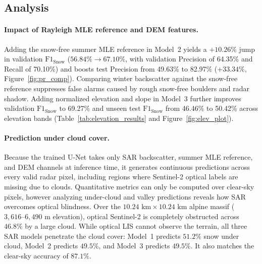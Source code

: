 \documentclass{article}
\begin{document}
\subsection{Analysis}
\paragraph{Impact of Rayleigh MLE reference and DEM features.} Adding the snow-free summer MLE reference in Model~2 yields a $+10.26\%$ jump in validation $\text{F1}_{\text{Snow}}$ ($56.84\% \rightarrow 67.10\%$, with validation Precision of 64.35\% and Recall of 70.10\%) and boosts test Precision from 49.63\% to 82.97\% ($+33.34\%$, Figure~\ref{fig:pr_comp}). Comparing winter backscatter against the snow-free reference suppresses false alarms caused by rough snow-free boulders and radar shadow. Adding normalized elevation and slope in Model~3 further improves validation $\text{F1}_{\text{Snow}}$ to 69.27\% and unseen test $\text{F1}_{\text{Snow}}$ from 46.46\% to 50.42\% across elevation bands (Table~\ref{tab:elevation_results} and Figure~\ref{fig:elev_plot}).

\paragraph{Prediction under cloud cover.} Because the trained U-Net takes only SAR backscatter, summer MLE reference, and DEM channels at inference time, it generates continuous predictions across every valid radar pixel, including regions where Sentinel-2 optical labels are missing due to clouds. Quantitative metrics can only be computed over clear-sky pixels, however analyzing under-cloud and valley predictions reveals how SAR overcomes optical blindness. Over the $10.24\text{ km} \times 10.24\text{ km}$ alpine massif ($3{,}616\text{--}6{,}490\text{ m}$ elevation), optical Sentinel-2 is completely obstructed across $46.8\%$ by a large cloud. While optical LIS cannot observe the terrain, all three SAR models penetrate the cloud cover: Model~1 predicts $51.2\%$ snow under cloud, Model~2 predicts $49.5\%$, and Model~3 predicts $49.5\%$. It also matches the clear-sky accuracy of $87.1\%$.
\end{document}
